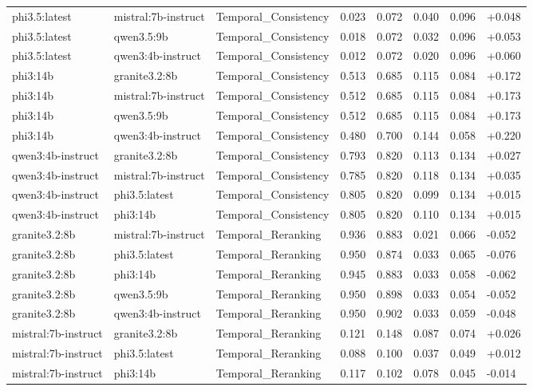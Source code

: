 \begin{table}
\begin{tabular}{llllllll}
phi3.5:latest & mistral:7b-instruct & Temporal_Consistency & 0.023 & 0.072 & 0.040 & 0.096 & +0.048 \\
phi3.5:latest & qwen3.5:9b & Temporal_Consistency & 0.018 & 0.072 & 0.032 & 0.096 & +0.053 \\
phi3.5:latest & qwen3:4b-instruct & Temporal_Consistency & 0.012 & 0.072 & 0.020 & 0.096 & +0.060 \\
phi3:14b & granite3.2:8b & Temporal_Consistency & 0.513 & 0.685 & 0.115 & 0.084 & +0.172 \\
phi3:14b & mistral:7b-instruct & Temporal_Consistency & 0.512 & 0.685 & 0.115 & 0.084 & +0.173 \\
phi3:14b & qwen3.5:9b & Temporal_Consistency & 0.512 & 0.685 & 0.115 & 0.084 & +0.173 \\
phi3:14b & qwen3:4b-instruct & Temporal_Consistency & 0.480 & 0.700 & 0.144 & 0.058 & +0.220 \\
qwen3:4b-instruct & granite3.2:8b & Temporal_Consistency & 0.793 & 0.820 & 0.113 & 0.134 & +0.027 \\
qwen3:4b-instruct & mistral:7b-instruct & Temporal_Consistency & 0.785 & 0.820 & 0.118 & 0.134 & +0.035 \\
qwen3:4b-instruct & phi3.5:latest & Temporal_Consistency & 0.805 & 0.820 & 0.099 & 0.134 & +0.015 \\
qwen3:4b-instruct & phi3:14b & Temporal_Consistency & 0.805 & 0.820 & 0.110 & 0.134 & +0.015 \\
granite3.2:8b & mistral:7b-instruct & Temporal_Reranking & 0.936 & 0.883 & 0.021 & 0.066 & -0.052 \\
granite3.2:8b & phi3.5:latest & Temporal_Reranking & 0.950 & 0.874 & 0.033 & 0.065 & -0.076 \\
granite3.2:8b & phi3:14b & Temporal_Reranking & 0.945 & 0.883 & 0.033 & 0.058 & -0.062 \\
granite3.2:8b & qwen3.5:9b & Temporal_Reranking & 0.950 & 0.898 & 0.033 & 0.054 & -0.052 \\
granite3.2:8b & qwen3:4b-instruct & Temporal_Reranking & 0.950 & 0.902 & 0.033 & 0.059 & -0.048 \\
mistral:7b-instruct & granite3.2:8b & Temporal_Reranking & 0.121 & 0.148 & 0.087 & 0.074 & +0.026 \\
mistral:7b-instruct & phi3.5:latest & Temporal_Reranking & 0.088 & 0.100 & 0.037 & 0.049 & +0.012 \\
mistral:7b-instruct & phi3:14b & Temporal_Reranking & 0.117 & 0.102 & 0.078 & 0.045 & -0.014 \\

\end{tabular}
\end{table}
